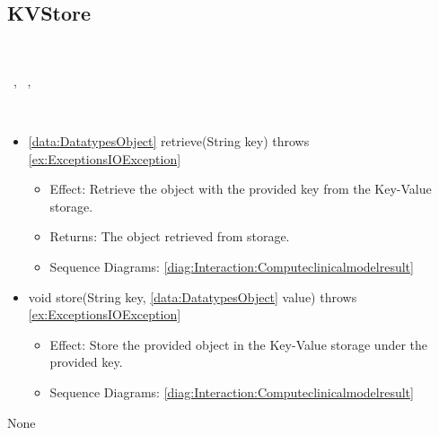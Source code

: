   \subsection{KVStore}\label{int:InterfacesKVStore}
    \begin{description}
      \item[Provided by:] \iconcomponent{}~
      \item[Required by:] \iconcomponent{}~, \iconcomponent{}~, \iconcomponent{}~ 
      \item[Operations:] ~
    \begin{itemize}[noitemsep,nolistsep,leftmargin=-.25cm]
      \item \textsf{\ref{data:DatatypesObject} retrieve(String key) throws \ref{ex:ExceptionsIOException}}
        \begin{itemize}[noitemsep,nolistsep]
           \item Effect: Retrieve the object with the provided key from the Key-Value storage. 
           \item Returns: The object retrieved from storage.
           \item Sequence Diagrams: \cref{diag:Interaction:Computeclinicalmodelresult}
        \end{itemize}
      \item \textsf{void store(String key, \ref{data:DatatypesObject} value) throws \ref{ex:ExceptionsIOException}}
        \begin{itemize}[noitemsep,nolistsep]
           \item Effect: Store the provided object in the Key-Value storage under the provided key. 
           \item Sequence Diagrams: \cref{diag:Interaction:Computeclinicalmodelresult}
        \end{itemize}
    \end{itemize}
      \item[Diagrams:] None
    \end{description}


